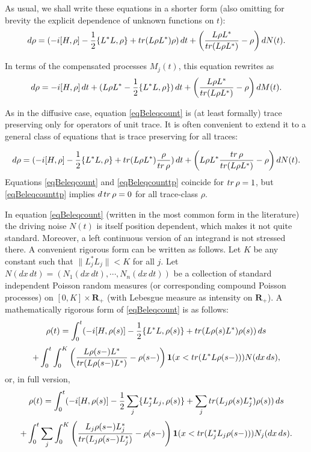 \documentclass[10pt,a4paper]{amsart}
\def\R{\mathbf{R}}
\def\1{\mathbf{1}}
\def\tr{\rm{tr}}
\begin{document}
As usual, we shall write these equations in a shorter form
(also omitting for brevity the explicit dependence of unknown functions on $t$):
 \begin{equation}
\label{eqBeleqcount}
d\rho=(- i[H, \rho] -\frac12 \{L^*L,\rho\}+ {\tr} (L\rho L^*) \rho ) \, dt
+\left(\frac{L\rho L^*}{{\tr} (L\rho L^*)}-\rho\right) dN(t).
\end{equation}

In terms of the compensated processes $M_j(t)$, this equation rewrites as
\begin{equation}
\label{eqBeleqcountm1}
d\rho=- i[H, \rho]\, dt +(L\rho L^*-\frac12 \{L^*L,\rho\} ) \, dt
+\left(\frac{L\rho L^*}{{\tr} (L\rho L^*)}-\rho\right) dM(t).
\end{equation}

As in the diffusive case, equation \eqref{eqBeleqcount} is (at least formally) trace preserving
only for operators of unit trace. It is often convenient to extend it to a general class of equations
that is trace preserving for all traces:

\begin{equation}
\label{eqBeleqcounttp}
d\rho=(- i[H, \rho] -\frac12 \{L^*L,\rho\}+ {\tr} (L\rho L^*) \frac{\rho}{{\tr}\, \rho} ) \, dt
+\left( L\rho L^*  \frac{{\tr}\, \rho}{{\tr} (L\rho L^*)}-\rho\right) dN(t).
\end{equation}
Equations \eqref{eqBeleqcount} and \eqref{eqBeleqcounttp} coincide for ${\tr}\,\rho=1$,
but \eqref{eqBeleqcounttp} implies $d\,{\tr}\, \rho=0$ for all trace-class $\rho$.


In equation \eqref{eqBeleqcount} (written in the most common form in the literature)
the driving noise $N(t)$ is itself
position dependent, which makes it not quite standard.
Moreover, a left continuous version of an integrand is not stressed there.
A convenient rigorous
form can be written as follows. Let $K$ be any constant such that $ \| L_j^*L_j \| <K$ for all $j$.
Let $N(dx \, dt)=(N_1(dx \, dt), \cdots, N_n(dx\, dt))$ be a collection of standard independent
Poisson random measures (or corresponding compound Poisson processes)
on $[0,K]\times \R_+$ (with Lebesgue measure
as intensity on $\R_+$). A mathematically rigorous form of \eqref{eqBeleqcount} is as follows:
\[
\rho (t)=\int_0^t (- i[H, \rho(s)] -\frac12 \{L^*L,\rho(s)\}+ {\tr} (L\rho(s) L^*) \rho(s) )\, ds
\]
\begin{equation}
\label{eqBeleqcountind}
+\int_0^t \int_0^K \left(\frac{L\rho(s-) L^*}{{\tr} (L\rho(s-) L^*)}-\rho(s-)\right)
\1(x< {\tr} (L^*L\rho(s-))) N(dx\, ds),
\end{equation}
or, in full version,
 \[
\rho (t)=\int_0^t (- i[H, \rho(s)] -\frac12 \sum_j \{L_j^*L_j,\rho(s)\}
+ \sum_j {\tr} (L_j\rho(s) L_j^*) \rho(s) )\, ds
\]
\[
+\int_0^t \sum_j \int_0^K \left(\frac{L_j\rho(s-) L_j^*}{{\tr} (L_j\rho(s-) L_j^*)}-\rho(s-)\right)
\1(x< {\tr} (L_j^*L_j\rho(s-))) N_j(dx\, ds).
\]
\end{document}
